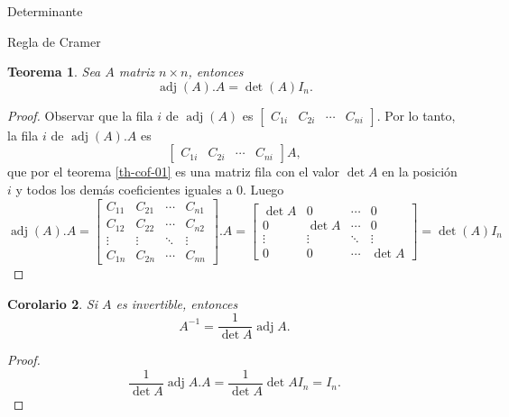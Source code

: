 \documentclass[a4paper,12pt,twoside,spanish]{amsbook}
\newtheorem{teorema}{Teorema}[section]
\newtheorem{corolario}[teorema]{Corolario}
\theoremstyle{definition}
\theoremstyle{remark}
\begin{document}
\begin{chapter}{Determinante}
\begin{section}{Regla de Cramer}
		 	\begin{teorema} Sea $A$ matriz $n \times n$,  entonces
		 		\begin{equation*}
		 		\operatorname{adj}(A).A = \det(A)I_n.
		 		\end{equation*}
		 	\end{teorema}
		 	\begin{proof}
		 		Observar que la fila $i$ de $\operatorname{adj}(A)$ es $\begin{bmatrix} C_{1i} & C_{2i} & \cdots & C_{ni}\end{bmatrix}$. Por lo tanto, la fila $i$ de $\operatorname{adj}(A).A$ es
		 		$$
		 		\begin{bmatrix} C_{1i} & C_{2i} & \cdots & C_{ni}\end{bmatrix} A,
		 		$$ 
		 		que por el teorema \ref{th-cof-01} es una matriz fila con el valor $\det A$ en la posición $i$ y todos los demás coeficientes iguales a 0. Luego
		 		$$
		 		\operatorname{adj}(A).A = 
		 		\begin{bmatrix} C_{11} & C_{21} & \cdots & C_{n1}\\
		 		C_{12} & C_{22} & \cdots & C_{n2} \\
		 		\vdots & \vdots & \ddots & \vdots \\
		 		C_{1n} & C_{2n} & \cdots & C_{nn}\end{bmatrix}. A = 
		 		\begin{bmatrix}\det A & 0 & \cdots & 0\\
		 		0 & \det A & \cdots & 0 \\
		 		\vdots & \vdots & \ddots & \vdots \\
		 		0 & 0 & \cdots & \det A\end{bmatrix} = \det(A) I_n
		 		$$
		 	\end{proof}
		 	
		 	\begin{corolario}\label{cor-inv-x-det}
		 		Si $A$  es invertible,  entonces 
		 		\begin{equation*}
		 		A^{-1} = \frac{1}{\det A} \operatorname{adj}A.
		 		\end{equation*}
		 	\end{corolario}
		 	\begin{proof}
		 		\begin{equation*}
		 		\frac{1}{\det A} \operatorname{adj}A.A = \frac{1}{\det A}\det A I_n = I_n.
		 		\end{equation*}
		 	\end{proof}
		 	

\end{section}
\end{chapter}
\end{document}
